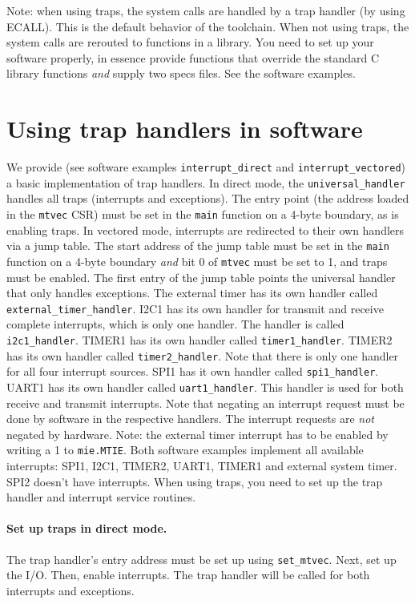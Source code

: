 \documentclass[12pt]{article}
\begin{document}
Note: when using traps, the system calls are handled by a trap handler (by using ECALL). This is the default behavior of the toolchain. When not using traps, the system calls are rerouted to functions in a library. You need to set up your software properly, in essence provide functions that override the standard C library functions \textit{and} supply two specs files. See the software examples.

\section{Using trap handlers in software}
\label{sec:traphandling}
We provide (see software examples \lstinline|interrupt_direct| and \lstinline|interrupt_vectored|) a basic implementation of trap handlers. In direct mode, the \lstinline|universal_handler| handles all traps (interrupts and exceptions). The entry point (the address loaded in the \lstinline|mtvec| CSR) must be set in the \lstinline|main| function on a 4-byte boundary, as is enabling traps. In vectored mode, interrupts are redirected to their own handlers via a jump table. The start address of the jump table must be set in the \lstinline|main| function on a 4-byte boundary \textit{and} bit 0 of \lstinline|mtvec| must be set to 1, and traps must be enabled. The first entry of the jump table points the universal handler that only handles exceptions. The external timer has its own handler called \lstinline|external_timer_handler|. I2C1 has its own handler for transmit and receive complete interrupts, which is only one handler. The handler is called \lstinline|i2c1_handler|. TIMER1 has its own handler called \lstinline|timer1_handler|. TIMER2 has its own handler called \lstinline|timer2_handler|. Note that there is only one handler for all four interrupt sources. SPI1 has it own handler called \lstinline|spi1_handler|. UART1 has its own handler called \lstinline|uart1_handler|. This handler is used for both receive and transmit interrupts. Note that negating an interrupt request must be done by software in the respective handlers. The interrupt requests are \emph{not} negated by hardware. Note: the external timer interrupt has to be enabled by writing a 1 to \lstinline|mie.MTIE|. Both software examples implement all available interrupts: SPI1, I2C1, TIMER2, UART1, TIMER1 and external system timer. SPI2 doesn't have interrupts. When using traps, you need to set up the trap handler and interrupt service routines.

\paragraph*{Set up traps in direct mode.} The trap handler's entry address must be set up using \lstinline|set_mtvec|. Next, set up the I/O. Then, enable interrupts. The trap handler will be called for both interrupts and exceptions.
\end{document}
